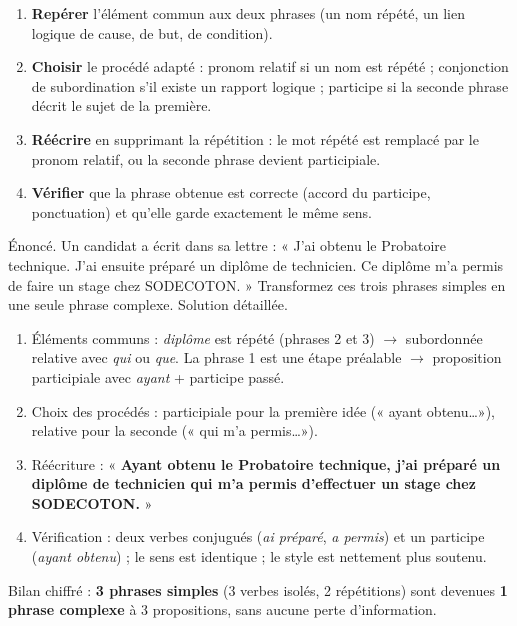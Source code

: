 \documentclass[11pt]{article}
\begin{document}
\begin{methode}
\begin{enumerate}
\item \textbf{Repérer} l'élément commun aux deux phrases (un nom répété, un lien logique de cause, de but, de condition).
\item \textbf{Choisir} le procédé adapté : pronom relatif si un nom est répété ; conjonction de subordination s'il existe un rapport logique ; participe si la seconde phrase décrit le sujet de la première.
\item \textbf{Réécrire} en supprimant la répétition : le mot répété est remplacé par le pronom relatif, ou la seconde phrase devient participiale.
\item \textbf{Vérifier} que la phrase obtenue est correcte (accord du participe, ponctuation) et qu'elle garde exactement le même sens.
\end{enumerate}
\end{methode}

\begin{exoresolu}
Énoncé. Un candidat a écrit dans sa lettre : « J'ai obtenu le Probatoire technique. J'ai ensuite préparé un diplôme de technicien. Ce diplôme m'a permis de faire un stage chez SODECOTON. » Transformez ces trois phrases simples en une seule phrase complexe.
\tcblower
Solution détaillée.
\begin{enumerate}
\item Éléments communs : \emph{diplôme} est répété (phrases 2 et 3) $\rightarrow$ subordonnée relative avec \emph{qui} ou \emph{que}. La phrase 1 est une étape préalable $\rightarrow$ proposition participiale avec \emph{ayant} + participe passé.
\item Choix des procédés : participiale pour la première idée (« ayant obtenu\ldots »), relative pour la seconde (« qui m'a permis\ldots »).
\item Réécriture : « \textbf{Ayant obtenu le Probatoire technique, j'ai préparé un diplôme de technicien qui m'a permis d'effectuer un stage chez SODECOTON.} »
\item Vérification : deux verbes conjugués (\emph{ai préparé}, \emph{a permis}) et un participe (\emph{ayant obtenu}) ; le sens est identique ; le style est nettement plus soutenu.
\end{enumerate}
Bilan chiffré : \textbf{3 phrases simples} (3 verbes isolés, 2 répétitions) sont devenues \textbf{1 phrase complexe} à 3 propositions, sans aucune perte d'information.
\end{exoresolu}
\end{document}
